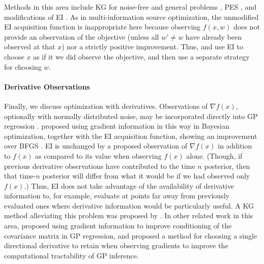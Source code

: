 \documentclass{article}
\begin{document}
Methods in this area include KG for noise-free \citep{xie2012optimization} and general problems \citep{toscano2018bayesian}, PES \citep{swersky2013multi}, and modifications of EI \citep{groot2010bayesian,williams2000sequential}.
As in multi-information source optimization, the unmodified EI acquisition function is inappropriate here because observing $f(x,w)$ does not provide an observation of the objective (unless all $w'\ne w$ have already been observed at that $x$) nor a strictly positive improvement.
Thus, \cite{groot2010bayesian} and \cite{williams2000sequential} use EI to choose $x$ as if it we did observe the objective, and then use a separate strategy for choosing $w$.


\paragraph{Derivative Observations}
Finally, we discuss optimization with derivatives.  Observations of $\nabla f(x)$, optionally with normally distributed noise, may be incorporated directly into GP regression \citep[Sect 9.4]{RaWi06}.  \cite{Li08} proposed using gradient information in this way in Bayesian optimization, together with the EI acquisition function, showing an improvement over BFGS \citep{liu1989limited}.  EI is unchanged by a proposed observation of $\nabla f(x)$ in addition to $f(x)$ as compared to its value when observing $f(x)$ alone.  (Though, if previous derivative observations have contributed to the time $n$ posterior, then that time-$n$ posterior will differ from what it would be if we had observed only $f(x)$.) Thus, EI does not take advantage of the availability of derivative information to, for example, evaluate at points far away from previously evaluated ones where derivative information would be particularly useful.  A KG method alleviating this problem was proposed by \cite{wu2017gradient}.  In other related work in this area, \cite{osborne2009gaussian} proposed using gradient information to improve conditioning of the covariance matrix in GP regression, and \cite{ahmed2016we} proposed a method for choosing a single directional derivative to retain when observing gradients to improve the computational tractability of GP inference.

\end{document}
